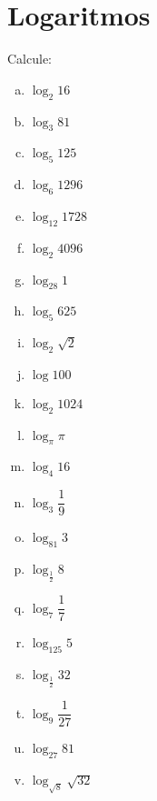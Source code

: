 \chapter{Logaritmos}

	\item Calcule:
	\begin{multicols}{2}
	\begin{enumerate}[a)]
		\item $\log_2 16$
		\item $\log_3 81$
		\item $\log_5 125$
		\item $\log_6 1296$
		\item $\log_12 1728$
		\item $\log_2 4096$
		\item $\log_28 1$
		\item $\log_5 625$
		\item $\log_2 \sqrt{2}$
		\item $\log 100$
		\item $\log_2 1024$
		\item $\log_\pi \pi$
		\item $\log_4 16$
		\item $\log_3 \dfrac{1}{9}$
		\item $\log_81 3$
		\item $\log_\frac{1}{2} 8$
		\item $\log_7 \dfrac{1}{7}$
		\item $\log_125 5$
		\item $\log_\frac{1}{2} 32$
		\item $\log_9 \dfrac{1}{27}$
		\item $\log_27 81$
		\item $\log_{\sqrt{8}} \sqrt{32}$
	\end{enumerate}
	\end{multicols}
